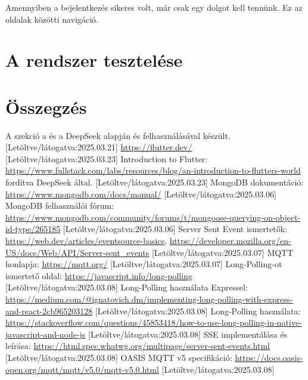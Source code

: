 \documentclass{thesis-ekf}
\theoremstyle{definition}
\theoremstyle{remark}
\begin{document}
	Amennyiben a bejelentkezés sikeres volt, már csak egy dolgot kell tennünk. Ez az oldalak közötti navigáció. 
	\chapter{A rendszer tesztelése}
	
	\chapter*{Összegzés}
\begin{thebibliography}{8}
	A szekció a \href{https://blockchainsimplified.com/blog/mongodb-introduction/}{\color{blue}{Blockchain Simplified}} és a DeepSeek alapján és felhasználásával készült.
	[Letöltve/látogatva:2025.03.21]
	\url{https://flutter.dev/}
	[Letöltve/látogatva:2025.03.23]
	Introduction to Flutter: \url{https://www.fullstack.com/labs/resources/blog/an-introduction-to-flutters-world} fordítva DeepSeek által.
	[Letöltve/látogatva:2025.03.23]
	MongoDB dokumentáció: \url{https://www.mongodb.com/docs/manual/} [Letöltve/látogatva:2025.03.06]
	MongoDB felhasználói fórum: \url{https://www.mongodb.com/community/forums/t/mongoose-querying-on-object-id-type/265185}
	[Letöltve/látogatva:2025.03.06]
	Server Sent Event ismertetők: \url{https://web.dev/articles/eventsource-basics}, \url{https://developer.mozilla.org/en-US/docs/Web/API/Server-sent_events}
	[Letöltve/látogatva:2025.03.07]
	 MQTT honlapja: \url{https://mqtt.org/}
	[Letöltve/látogatva:2025.03.07]
	 Long-Polling-ot ismertető oldal: \url{https://javascript.info/long-polling}
	[Letöltve/látogatva:2025.03.08]
	 Long-Polling használata Expressel: \url{https://medium.com/@ignatovich.dm/implementing-long-polling-with-express-and-react-2cb965203128}
	[Letöltve/látogatva:2025.03.08]
	 Long-Polling használata: \url{https://stackoverflow.com/questions/45853418/how-to-use-long-polling-in-native-javascript-and-node-js}
	[Letöltve/látogatva:2025.03.08]
	 SSE implementálása és leírása: \url{https://html.spec.whatwg.org/multipage/server-sent-events.html}
	[Letöltve/látogatva:2025.03.08]
	OASIS MQTT v5 specifikáció: \url{https://docs.oasis-open.org/mqtt/mqtt/v5.0/mqtt-v5.0.html}
	[Letöltve/látogatva:2025.03.08]

\end{thebibliography}
\end{document}
